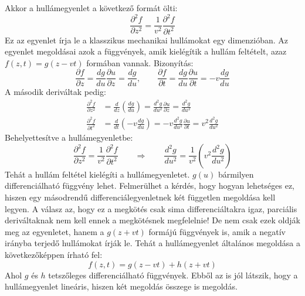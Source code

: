 \documentclass[a4paper,12pt]{article}
\begin{document}
Akkor a hullámegyenlet a következő formát ölti:
\begin{equation}
    \boxed{\frac{\partial^2 f}{\partial z^2} = \frac{1}{v^2} \frac{\partial^2 f}{\partial t^2}}
\end{equation}
Ez az egyenlet írja le a klasszikus mechanikai hullámokat egy dimenzióban. Az egyenlet megoldásai azok a függvények, amik kielégítik a hullám feltételt, azaz $f(z, t) = g(z - vt)$ formában vannak.
Bizonyítás:
\begin{equation}
    \frac{\partial f}{\partial z} = \frac{dg}{du} \frac{\partial u}{\partial z} = \frac{dg}{du}, \qquad \frac{\partial f}{\partial t} = \frac{dg}{du} \frac{\partial u}{\partial t} = -v \frac{dg}{du}
\end{equation}
A második deriváltak pedig:
\begin{equation}
    \begin{aligned}
        \frac{\partial^2 f}{\partial z^2} &= \frac{d}{dz} \left( \frac{dg}{du} \right) = \frac{d^2 g}{du^2} \frac{\partial u}{\partial z} = \frac{d^2 g}{du^2} \\
        \frac{\partial^2 f}{\partial t^2} &= \frac{d}{dt} \left( -v \frac{dg}{du} \right) = -v \frac{d^2 g}{du^2} \frac{\partial u}{\partial t} = v^2 \frac{d^2 g}{du^2}
    \end{aligned}
\end{equation}
Behelyettesítve a hullámegyenletbe:
\begin{equation}
    \frac{\partial^2 f}{\partial z^2} = \frac{1}{v^2} \frac{\partial^2 f}{\partial t^2} \qquad \Rightarrow \qquad \frac{d^2 g}{du^2} = \frac{1}{v^2} \left( v^2 \frac{d^2 g}{du^2} \right)
\end{equation}
Tehát a hullám feltétel kielégíti a hullámegyenletet. $g(u)$ bármilyen differenciálható függvény lehet. Felmerülhet a kérdés, hogy hogyan lehetséges ez, hiszen egy másodrendű differenciálegyenletnek
két független megoldása kell legyen. A válasz az, hogy ez a megkötés csak sima differenciáltakra igaz, parciális deriváltaknak nem kell ennek a megkötésnek megfelelnie! De nem csak ezek oldják meg
az egyenletet, hanem a $g(z + vt)$ formájú függvények is, amik a negatív irányba terjedő hullámokat írják le. Tehát a hullámegyenlet általános megoldása a következőképpen írható fel:
\begin{equation}
    \boxed{f(z, t) = g(z - vt) + h(z + vt)}
\end{equation}
Ahol $g$ és $h$ tetszőleges differenciálható függvények. Ebből az is jól látszik, hogy a hullámegyenlet lineáris, hiszen két megoldás összege is megoldás.
\end{document}

